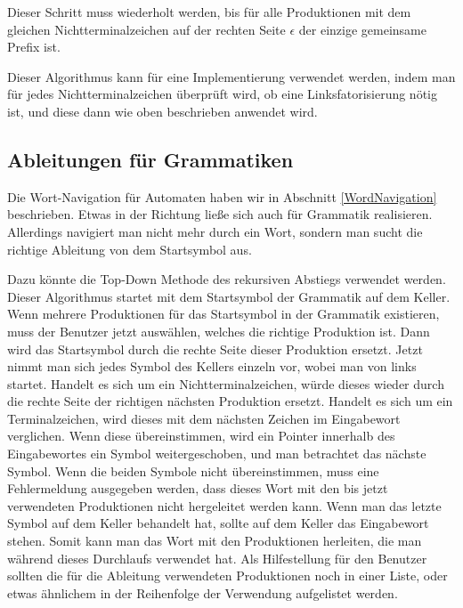 \noindent
Dieser Schritt muss wiederholt werden, bis für alle Produktionen mit dem
glei\-chen Nichtterminalzeichen auf der rechten Seite $\epsilon$ der einzige
gemeinsame Prefix ist.\vspace{10pt}

Dieser Algorithmus kann für eine Implementierung verwendet werden, indem man für
jedes Nichtterminalzeichen überprüft wird, ob eine Linksfatorisierung nötig ist,
und diese dann wie oben beschrieben anwendet wird.


\subsection{Ableitungen für Grammatiken}\label{PerspectiveGrammarWordNavigation}

Die Wort-Navigation für Automaten haben wir in Abschnitt
\ref{WordNavigation} beschrieben. Etwas in der Richtung ließe sich
auch für Grammatik realisieren. Allerdings navigiert man nicht mehr
durch ein Wort, sondern man sucht die richtige Ableitung von dem
Startsymbol aus.\vspace{10pt}

Dazu könnte die Top-Down Methode des rekursiven Abstiegs verwendet werden. Dieser
Algorithmus startet mit dem Startsymbol der Grammatik auf dem Keller. Wenn
mehrere Produktionen für das Startsymbol in der Grammatik existieren, muss der
Benutzer jetzt auswählen, welches die richtige Produktion ist. Dann wird das
Startsymbol durch die rechte Seite dieser Produktion ersetzt. Jetzt nimmt man
sich jedes Symbol des Kellers einzeln vor, wobei man von links startet. Handelt
es sich um ein Nichtterminalzeichen, würde dieses wieder durch die rechte Seite der
richtigen nächsten Produktion ersetzt. Handelt es sich um ein Terminalzeichen,
wird dieses mit dem nächsten Zeichen im Eingabewort verglichen. Wenn diese
übereinstimmen, wird ein Pointer innerhalb des Eingabewortes ein Symbol
weitergeschoben, und man betrachtet das nächste Symbol. Wenn die beiden Symbole
nicht übereinstimmen, muss eine Fehlermeldung ausgegeben werden, dass dieses Wort
mit den bis jetzt verwendeten Produktionen nicht hergeleitet werden kann. Wenn
man das letzte Symbol auf dem Keller behandelt hat, sollte auf dem Keller das
Eingabewort stehen. Somit kann man das Wort mit den Produktionen herleiten, die
man während dieses Durchlaufs verwendet hat. Als Hilfestellung für den Benutzer
sollten die für die Ableitung verwendeten Produktionen noch in einer Liste, oder
etwas ähnlichem in der Reihenfolge der Verwendung aufgelistet
werden.\vspace{10pt}

